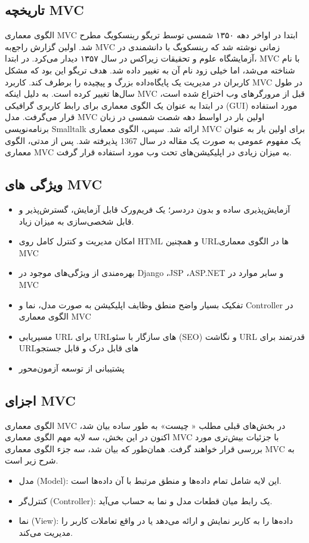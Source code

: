 \subsection{تاریخچه MVC}
الگوی معماری MVC ابتدا در ‌اواخر دهه ۱۳۵۰ شمسی توسط تریگو رینسکویگ
 مطرح شد. اولین گزارش راجع‌به MVC زمانی نوشته شد که رینسکویگ با دانشمندی در آزمایشگاه علوم و تحقیقات زیراکس
  در سال ۱۳۵۷ دیدار می‌کرد. در ابتدا، MVC با نام
 شناخته می‌شد، اما خیلی زود نام آن به
 تغییر داده شد. هدف تریگو این بود که مشکل کاربران در مدیریت یک پایگاه‌داده بزرگ و پیچیده را برطرف کند.
کاربرد MVC‌ در طول سال‌ها تغییر کرده است. به دلیل اینکه MVC‌ قبل از مرورگرهای وب اختراع شده است، در ابتدا به عنوان یک الگوی معماری برای رابط کاربری گرافیکی (GUI) مورد استفاده قرار می‌گرفت. مدل MVC اولین بار در اواسط دهه شصت شمسی در زبان برنامه‌نویسی Smalltalk ارائه شد. سپس، الگوی معماری MVC برای اولین بار به عنوان یک مفهوم عمومی به صورت یک مقاله در سال 1367 پذیرفته شد. پس از مدتی، الگوی معماری MVC به میزان زیادی در اپلیکیشن‌های تحت وب مورد استفاده قرار گرفت.

\subsection{ویژگی های MVC}
\begin{itemize}
	\item
	آزمایش‌پذیری ساده و بدون دردسر؛ یک فریم‌ورک قابل آزمایش، گسترش‌پذیر و قابل شخصی‌سازی به میزان زیاد.
	\item
	امکان مدیریت و کنترل کامل روی HTML و همچنین URLها در الگوی معماری MVC
	\item
	بهره‌مندی از ویژگی‌های موجود در Django ،JSP ،ASP.NET و سایر موارد در MVC
	\item
	تفکیک بسیار واضح منطق وظایف اپلیکیشن به صورت مدل، نما و Controller‌ در الگوی معماری MVC
	\item
	مسیریابی URL‌ برای URLهای سازگار با سئو (SEO) و نگاشت URL قدرتمند برای URLهای قابل درک و قابل جستجو
	\item
	پشتیبانی از توسعه آزمون‌محور
\end{itemize}


\subsection{اجزای MVC}
الگوی معماری MVC در بخش‌های قبلی مطلب « چیست» به طور ساده بیان شد، اکنون در این بخش، سه لایه مهم الگوی معماری MVC با جزئیات بیش‌تری مورد بررسی قرار خواهند گرفت. همان‌طور که بیان شد، سه جزء الگوی معماری MVC به شرح زیر است.
\begin{itemize}
	\item
	مدل (Model): این لایه شامل تمام داده‌ها و منطق مرتبط با آن داده‌ها است.
	\item
	کنترل‌گر (Controller): یک رابط میان قطعات مدل و نما به حساب می‌آید.
	\item
	نما (View): داده‌ها را به کاربر نمایش و ارائه می‌دهد یا در واقع تعاملات کاربر را مدیریت می‌کند.
\end{itemize}

